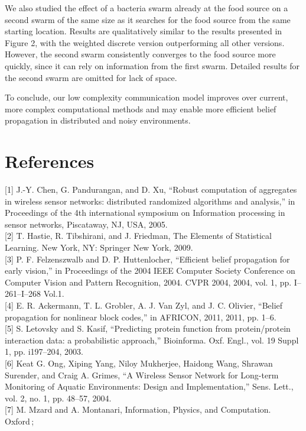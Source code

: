 \documentclass{article}
\begin{document}
We also studied the effect of a bacteria swarm already at the food source on a
second swarm of the same size as it searches for the food source from the
same starting location. Results are qualitatively similar to the results
presented in Figure 2, with the weighted discrete version outperforming all
other versions. However, the second swarm consistently converges to the food
source more quickly, since it can rely on information from the first swarm.
Detailed results for the second swarm are omitted for lack of space. 

To conclude, our low complexity communication model improves over current, more
complex computational methods and may enable more efficient belief propagation
in distributed and noisy environments.

\section*{References}
[1] J.-Y. Chen, G. Pandurangan, and D. Xu, ``Robust computation of aggregates in
wireless sensor networks: distributed randomized algorithms and analysis,'' in
Proceedings of the 4th international symposium on Information processing in
sensor networks, Piscataway, NJ, USA, 2005.\\[8pt]
[2] T. Hastie, R. Tibshirani, and J. Friedman, The Elements of Statistical
Learning. New York, NY: Springer New York, 2009.\\[8pt]
[3] P. F. Felzenszwalb and D. P. Huttenlocher, ``Efficient belief propagation
for early vision,'' in Proceedings of the 2004 IEEE Computer Society Conference
on Computer Vision and Pattern Recognition, 2004. CVPR 2004, 2004, vol. 1, pp.
I–261–I–268 Vol.1.\\[8pt]
[4] E. R. Ackermann, T. L. Grobler, A. J. Van Zyl, and J. C. Olivier, ``Belief
propagation for nonlinear block codes,'' in AFRICON, 2011, 2011, pp. 1–6.\\[8pt]
[5] S. Letovsky and S. Kasif, ``Predicting protein function from protein/protein
interaction data: a probabilistic approach,'' Bioinforma. Oxf. Engl., vol. 19
Suppl 1, pp. i197–204, 2003.\\[8pt]
[6] Keat G. Ong, Xiping Yang, Niloy Mukherjee, Haidong Wang, Shrawan Surender,
and Craig A. Grimes, ``A Wireless Sensor Network for Long-term Monitoring of
Aquatic Environments: Design and Implementation,'' Sens. Lett., vol. 2, no. 1,
pp. 48–57, 2004.\\[8pt]
[7] M. Mzard and A. Montanari, Information, Physics, and Computation. Oxford ;
\end{document}
